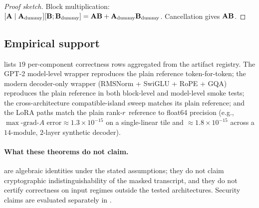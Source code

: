 \begin{proof}[Proof sketch]
Block multiplication: $[\mathbf{A}\mid\mathbf{A}_{\mathrm{dummy}}][\mathbf{B};\mathbf{B}_{\mathrm{dummy}}] = \mathbf{A}\mathbf{B} + \mathbf{A}_{\mathrm{dummy}}\mathbf{B}_{\mathrm{dummy}}$. Cancellation gives $\mathbf{A}\mathbf{B}$.
\end{proof}

\subsection*{Empirical support}
 lists $19$ per-component correctness rows aggregated from the artifact registry. The GPT-2 model-level wrapper reproduces the plain reference token-for-token; the modern decoder-only wrapper (RMSNorm + SwiGLU + RoPE + GQA) reproduces the plain reference in both block-level and model-level smoke tests; the cross-architecture compatible-island sweep matches its plain reference; and the LoRA paths match the plain rank-$r$ reference to float64 precision (e.g., $\max\text{-grad-}A\text{ error} \approx 1.3\times 10^{-15}$ on a single-linear tile and $\approx 1.8\times 10^{-15}$ across a $14$-module, $2$-layer synthetic decoder).



\paragraph{What these theorems do not claim.}
 are algebraic identities under the stated assumptions; they do not claim cryptographic indistinguishability of the masked transcript, and they do not certify correctness on input regimes outside the tested architectures. Security claims are evaluated separately in .
